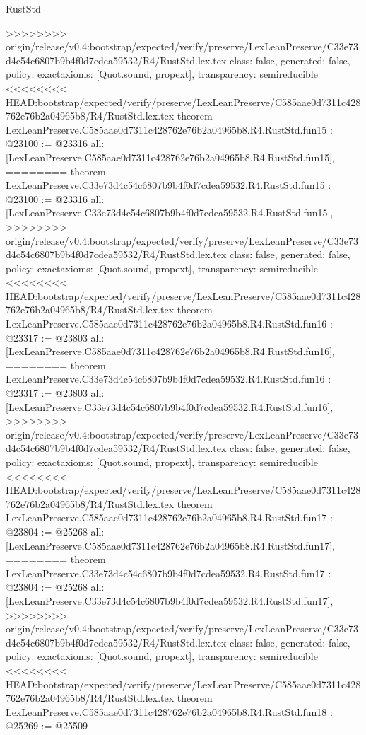 \begin{lexlean}{RustStd}
\begin{coremodule}
{\begin{coremodule}
{{{{{{{{{{{{{{{{{{>>>>>>>> origin/release/v0.4:bootstrap/expected/verify/preserve/LexLeanPreserve/C33e73d4c54c6807b9b4f0d7cdea59532/R4/RustStd.lex.tex
  class: false,
  generated: false,
  policy: exact{axioms: [Quot.sound, propext]},
  transparency: semireducible
}
<<<<<<<< HEAD:bootstrap/expected/verify/preserve/LexLeanPreserve/C585aae0d7311c428762e76b2a04965b8/R4/RustStd.lex.tex
theorem LexLeanPreserve.C585aae0d7311c428762e76b2a04965b8.R4.RustStd.fun15 : @23100 := @23316 {
  all: [LexLeanPreserve.C585aae0d7311c428762e76b2a04965b8.R4.RustStd.fun15],
========
theorem LexLeanPreserve.C33e73d4c54c6807b9b4f0d7cdea59532.R4.RustStd.fun15 : @23100 := @23316 {
  all: [LexLeanPreserve.C33e73d4c54c6807b9b4f0d7cdea59532.R4.RustStd.fun15],
>>>>>>>> origin/release/v0.4:bootstrap/expected/verify/preserve/LexLeanPreserve/C33e73d4c54c6807b9b4f0d7cdea59532/R4/RustStd.lex.tex
  class: false,
  generated: false,
  policy: exact{axioms: [Quot.sound, propext]},
  transparency: semireducible
}
<<<<<<<< HEAD:bootstrap/expected/verify/preserve/LexLeanPreserve/C585aae0d7311c428762e76b2a04965b8/R4/RustStd.lex.tex
theorem LexLeanPreserve.C585aae0d7311c428762e76b2a04965b8.R4.RustStd.fun16 : @23317 := @23803 {
  all: [LexLeanPreserve.C585aae0d7311c428762e76b2a04965b8.R4.RustStd.fun16],
========
theorem LexLeanPreserve.C33e73d4c54c6807b9b4f0d7cdea59532.R4.RustStd.fun16 : @23317 := @23803 {
  all: [LexLeanPreserve.C33e73d4c54c6807b9b4f0d7cdea59532.R4.RustStd.fun16],
>>>>>>>> origin/release/v0.4:bootstrap/expected/verify/preserve/LexLeanPreserve/C33e73d4c54c6807b9b4f0d7cdea59532/R4/RustStd.lex.tex
  class: false,
  generated: false,
  policy: exact{axioms: [Quot.sound, propext]},
  transparency: semireducible
}
<<<<<<<< HEAD:bootstrap/expected/verify/preserve/LexLeanPreserve/C585aae0d7311c428762e76b2a04965b8/R4/RustStd.lex.tex
theorem LexLeanPreserve.C585aae0d7311c428762e76b2a04965b8.R4.RustStd.fun17 : @23804 := @25268 {
  all: [LexLeanPreserve.C585aae0d7311c428762e76b2a04965b8.R4.RustStd.fun17],
========
theorem LexLeanPreserve.C33e73d4c54c6807b9b4f0d7cdea59532.R4.RustStd.fun17 : @23804 := @25268 {
  all: [LexLeanPreserve.C33e73d4c54c6807b9b4f0d7cdea59532.R4.RustStd.fun17],
>>>>>>>> origin/release/v0.4:bootstrap/expected/verify/preserve/LexLeanPreserve/C33e73d4c54c6807b9b4f0d7cdea59532/R4/RustStd.lex.tex
  class: false,
  generated: false,
  policy: exact{axioms: [Quot.sound, propext]},
  transparency: semireducible
}
<<<<<<<< HEAD:bootstrap/expected/verify/preserve/LexLeanPreserve/C585aae0d7311c428762e76b2a04965b8/R4/RustStd.lex.tex
theorem LexLeanPreserve.C585aae0d7311c428762e76b2a04965b8.R4.RustStd.fun18 : @25269 := @25509 {
}}}}}}}}}}}}}}}}}}}}}
\end{coremodule}}
\end{coremodule}
\end{lexlean}
